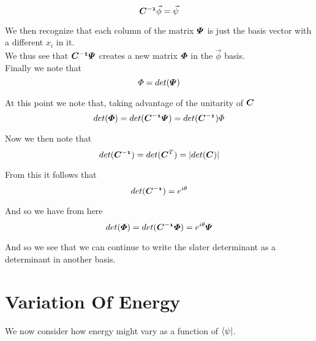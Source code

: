 \documentclass[11pt]{article} %
\begin{document}
\begin{equation}
\matrixsym{C^{-1}}\vec{\phi}=\vec{\psi}
\end{equation}

We then recognize that each column of the matrix $\matrixsym{\Psi}$ is just the basis vector with a different $x_i$ in it.\\

We thus see that $\matrixsym{C^{-1}}\matrixsym{\Psi}$ creates a new matrix $\matrixsym{\Phi}$ in the $\vec{\phi}$ basis.\\

Finally we note that\\

\begin{equation} \Phi=det(\matrixsym{\Psi}) \end{equation}

At this point we note that, taking advantage of the unitarity of $\matrixsym{C}$\\

\begin{equation} 
det(\matrixsym{\Phi})=det(\matrixsym{C^{-1}}\matrixsym{\Psi})=det(\matrixsym{C^{-1}})\Phi
\end{equation}

Now we then note that \\
\begin{equation}
det(\matrixsym{C^{-1}})=det({\matrixsym{C}^{T}})=|det({\matrixsym{C}})|
\end{equation}

From this it follows that 
\begin{equation}
det(\matrixsym{C^{-1}})=e^{i\theta}
\end{equation}

And so we have from here\\

\begin{equation}
det(\matrixsym{\Phi})=det(\matrixsym{C^{-1}}\matrixsym{\Phi})=e^{i\theta}\matrixsym{\Psi}
\end{equation}

And so we see that we can continue to write the slater determinant as a determinant in another basis.

\section{Variation Of Energy}

We now consider how energy might vary as a function of $\bra{\psi}$.\\
\end{document}
